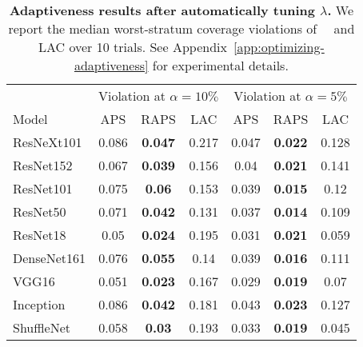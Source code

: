 \begin{table}[t]
\centering
\small
\begin{tabular}{lcccccc}
\toprule 
 & \multicolumn{3}{c}{Violation at $\alpha=10\%$}  & \multicolumn{3}{c}{Violation at $\alpha=5\%$} \\ 
\cmidrule(r){2-4}  \cmidrule(r){5-7} 
Model & APS & RAPS & LAC & APS & RAPS & LAC \\ 
\midrule 
ResNeXt101 & 0.086 & \bf 0.047 & 0.217 & 0.047 & \bf 0.022 & 0.128 \\ 
ResNet152 & 0.067 & \bf 0.039 & 0.156 & 0.04 & \bf 0.021 & 0.141 \\ 
ResNet101 & 0.075 & \bf 0.06 & 0.153 & 0.039 & \bf 0.015 & 0.12 \\ 
ResNet50 & 0.071 & \bf 0.042 & 0.131 & 0.037 & \bf 0.014 & 0.109 \\ 
ResNet18 & 0.05 & \bf 0.024 & 0.195 & 0.031 & \bf 0.021 & 0.059 \\ 
DenseNet161 & 0.076 & \bf 0.055 & 0.14 & 0.039 & \bf 0.016 & 0.111 \\ 
VGG16 & 0.051 & \bf 0.023 & 0.167 & 0.029 & \bf 0.019 & 0.07 \\ 
Inception & 0.086 & \bf 0.042 & 0.181 & 0.043 & \bf 0.023 & 0.127 \\ 
ShuffleNet & 0.058 & \bf 0.03 & 0.193 & 0.033 & \bf 0.019 & 0.045 \\ 
\bottomrule 
\end{tabular} 
\caption{\textbf{Adaptiveness results after automatically tuning $\lambda$.} We report the median worst-stratum coverage violations of \aps\, \raps\, and LAC over 10 trials. See Appendix~\ref{app:optimizing-adaptiveness} for experimental details.} 
\label{table:LAC-tunelambda} 
\end{table} 

